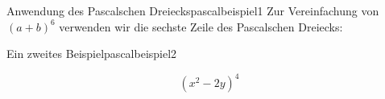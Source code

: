 \begin{bsp}{Anwendung des Pascalschen Dreiecks}{pascalbeispiel1}
    Zur Vereinfachung von \((a+b)^6\) verwenden wir die sechste Zeile des
    Pascalschen Dreiecks:
    \vspace*{10 cm}

\end{bsp}

\begin{bsp}{Ein zweites Beispiel}{pascalbeispiel2}

    \[
        (x^2-2y)^4
    \]

    \vspace*{5 cm}
\end{bsp}

